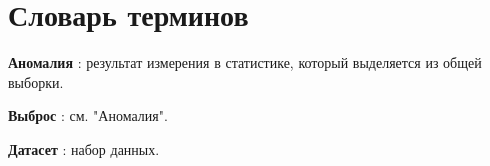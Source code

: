 \chapter*{Словарь терминов}             %

\textbf{Аномалия} : результат измерения в статистике, который выделяется из общей выборки.

\textbf{Выброс} : см. "Аномалия".

\textbf{Датасет} : набор данных.